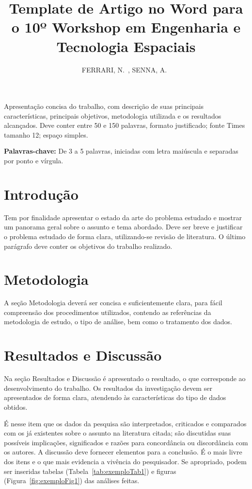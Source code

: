 \documentclass[12pt]{article}
\title{Template de Artigo no Word para o 10º Workshop em Engenharia e Tecnologia Espaciais}
\author{FERRARI, N.~\inst{1}, SENNA, A.~\inst{2}}
\begin{document}
\maketitle

\begin{resumo}
	Apresentação concisa do trabalho, com descrição de suas principais características, principais objetivos, metodologia utilizada e os resultados alcançados. Deve conter entre 50 e 150 palavras, formato justificado; fonte Times tamanho 12; espaço simples.
\end{resumo}
\hrulefill

\begin{flushleft}
	\textbf{Palavras-chave:} De 3 a 5 palavras, iniciadas com letra maiúscula e separadas por ponto e vírgula.
\end{flushleft}

\section{Introdução}

Tem por finalidade apresentar o estado da arte do problema estudado e mostrar um panorama geral sobre o assunto e tema abordado. Deve ser breve e justificar o problema estudado de forma clara, utilizando-se revisão de literatura. O último parágrafo deve conter os objetivos do trabalho realizado.

\section{Metodologia} \label{sec:met}

A seção Metodologia deverá ser concisa e suficientemente clara, para fácil compreensão dos procedimentos utilizados, contendo as referências da metodologia de estudo, o tipo de análise, bem como o tratamento dos dados.

\section{Resultados e Discussão}

Na seção Resultados e Discussão é apresentado o resultado, o que corresponde ao desenvolvimento do trabalho. Os resultados da investigação devem ser apresentados de forma clara, atendendo às características do tipo de dados obtidos.

É nesse item que os dados da pesquisa são interpretados, criticados e comparados com os já existentes sobre o assunto na literatura citada; são discutidas suas possíveis implicações, significados e razões para concordância ou discordância com os autores. A discussão deve fornecer elementos para a conclusão. É o mais livre dos itens e o que mais evidencia a vivência do pesquisador. Se apropriado, podem ser inseridas tabelas (Tabela~\ref{tab:exemploTab1}) e figuras (Figura~\ref{fig:exemploFig1}) das análises feitas.
\end{document}
